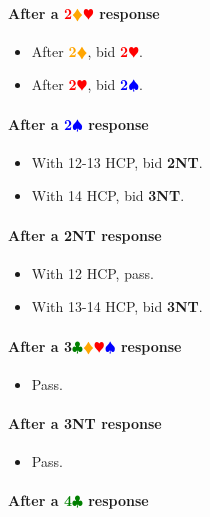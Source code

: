 \documentclass{article}
\newcommand{\Hs}{\textcolor{Red}{$\varheart$}}
\newcommand{\Ss}{\textcolor{Blue}{$\spadesuit$}}
\newcommand{\Ds}{\textcolor{Orange}{$\vardiamond$}}
\newcommand{\Cs}{\textcolor{Green}{$\clubsuit$}}
\newcommand{\NTs}{\textbf{\footnotesize{NT}}}
\renewcommand{\H}[1]{\textcolor{Red}{\textbf{#1}\Hs}}
\renewcommand{\S}[1]{\textcolor{Blue}{\textbf{#1}\Ss}}
\newcommand{\D}[1]{\textcolor{Orange}{\textbf{#1}\Ds}}
\newcommand{\C}[1]{\textcolor{Green}{\textbf{#1}\Cs}}
\newcommand{\NT}[1]{\textbf{#1\NTs}}
\newcommand{\suits}[1]{\textbf{#1}\Cs\Ds\Hs\Ss}
\newcommand{\reds}[1]{\textcolor{Red}{\textbf{#1}}\Ds\Hs}
\begin{document}
\paragraph{After a \reds{2}  response}

\begin{itemize}
\item After \D{2}, bid \H{2}.
\item After \H{2}, bid \S{2}.
\end{itemize}

\paragraph{After a \S{2} response}

\begin{itemize}
\item With 12-13 HCP, bid \NT{2}.
\item With 14 HCP, bid \NT{3}.
\end{itemize}

\paragraph{After a \NT{2} response}

\begin{itemize}
\item With 12 HCP, pass.
\item With 13-14 HCP, bid \NT{3}.
\end{itemize}

\paragraph{After a \suits{3} response}

\begin{itemize}
\item Pass.
\end{itemize}

\paragraph{After a \NT{3} response}

\begin{itemize}
\item Pass.
\end{itemize}

\paragraph{After a \C{4} response} 
\end{document}
